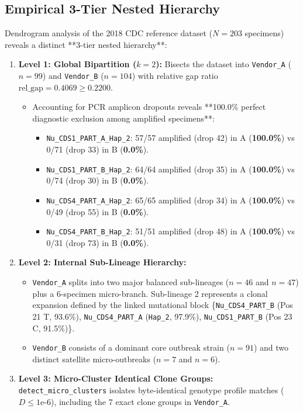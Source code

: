\documentclass[11pt,a4paper]{article}
\begin{document}
\subsection{Empirical 3-Tier Nested Hierarchy}

Dendrogram analysis of the 2018 CDC reference dataset ($N=203$ specimens) reveals a distinct **3-tier nested hierarchy**:

\begin{enumerate}
    \item \textbf{Level 1: Global Bipartition ($k=2$):} Bisects the dataset into \texttt{Vendor\_A} ($n=99$) and \texttt{Vendor\_B} ($n=104$) with relative gap ratio $\text{rel\_gap} = 0.4069 \ge 0.2200$.
    \begin{itemize}
        \item Accounting for PCR amplicon dropouts reveals **100.0\% perfect diagnostic exclusion among amplified specimens**:
        \begin{itemize}
            \item \texttt{Nu\_CDS1\_PART\_A\_Hap\_2}: 57/57 amplified (drop 42) in A (\textbf{100.0\%}) vs 0/71 (drop 33) in B (\textbf{0.0\%}).
            \item \texttt{Nu\_CDS1\_PART\_B\_Hap\_2}: 64/64 amplified (drop 35) in A (\textbf{100.0\%}) vs 0/74 (drop 30) in B (\textbf{0.0\%}).
            \item \texttt{Nu\_CDS4\_PART\_A\_Hap\_2}: 65/65 amplified (drop 34) in A (\textbf{100.0\%}) vs 0/49 (drop 55) in B (\textbf{0.0\%}).
            \item \texttt{Nu\_CDS4\_PART\_B\_Hap\_2}: 51/51 amplified (drop 48) in A (\textbf{100.0\%}) vs 0/31 (drop 73) in B (\textbf{0.0\%}).
        \end{itemize}
    \end{itemize}
    \item \textbf{Level 2: Internal Sub-Lineage Hierarchy:}
    \begin{itemize}
        \item \texttt{Vendor\_A} splits into two major balanced sub-lineages ($n=46$ and $n=47$) plus a 6-specimen micro-branch. Sub-lineage 2 represents a clonal expansion defined by the linked mutational block \{\texttt{Nu\_CDS4\_PART\_B} (Pos 21 T, 93.6\%), \texttt{Nu\_CDS4\_PART\_A} (\texttt{Hap\_2}, 97.9\%), \texttt{Nu\_CDS1\_PART\_B} (Pos 23 C, 91.5\%)\}.
        \item \texttt{Vendor\_B} consists of a dominant core outbreak strain ($n=91$) and two distinct satellite micro-outbreaks ($n=7$ and $n=6$).
    \end{itemize}
    \item \textbf{Level 3: Micro-Cluster Identical Clone Groups:} \texttt{detect\_micro\_clusters} isolates byte-identical genotype profile matches ($D \le 1\text{e-}6$), including the 7 exact clone groups in \texttt{Vendor\_A}.
\end{enumerate}
\end{document}
